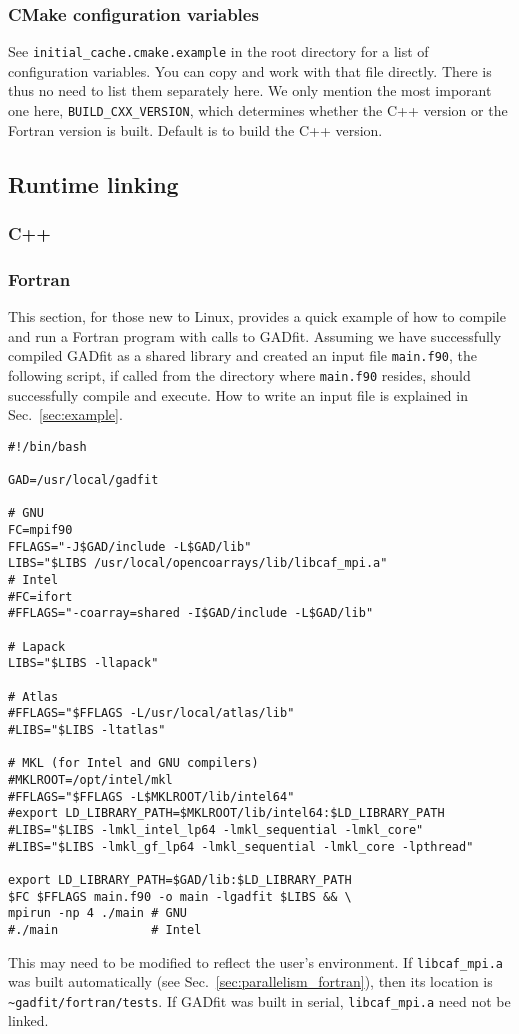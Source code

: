 \documentclass{article}
\begin{document}
\subsubsection{\label{sec:cmake_configuration}CMake configuration variables}

See \verb+initial_cache.cmake.example+ in the root directory for a list of configuration variables. You can copy and work with that file directly. There is thus no need to list them separately here. We only mention the most imporant one here, \verb+BUILD_CXX_VERSION+, which determines whether the C++ version or the Fortran version is built. Default is to build the C++ version.

\subsection{\label{sec:runtime}Runtime linking}

\subsubsection{C++}

\subsubsection{Fortran}

This section, for those new to Linux, provides a quick example of how to compile and run a Fortran program with calls to GADfit. Assuming we have successfully compiled GADfit as a shared library and created an input file \verb+main.f90+, the following script, if called from the directory where \verb+main.f90+ resides, should successfully compile and execute. How to write an input file is explained in Sec.~\ref{sec:example}.
\begin{verbatim}
#!/bin/bash

GAD=/usr/local/gadfit

# GNU
FC=mpif90
FFLAGS="-J$GAD/include -L$GAD/lib"
LIBS="$LIBS /usr/local/opencoarrays/lib/libcaf_mpi.a"
# Intel
#FC=ifort
#FFLAGS="-coarray=shared -I$GAD/include -L$GAD/lib"

# Lapack
LIBS="$LIBS -llapack"

# Atlas
#FFLAGS="$FFLAGS -L/usr/local/atlas/lib"
#LIBS="$LIBS -ltatlas"

# MKL (for Intel and GNU compilers)
#MKLROOT=/opt/intel/mkl
#FFLAGS="$FFLAGS -L$MKLROOT/lib/intel64"
#export LD_LIBRARY_PATH=$MKLROOT/lib/intel64:$LD_LIBRARY_PATH
#LIBS="$LIBS -lmkl_intel_lp64 -lmkl_sequential -lmkl_core"
#LIBS="$LIBS -lmkl_gf_lp64 -lmkl_sequential -lmkl_core -lpthread"

export LD_LIBRARY_PATH=$GAD/lib:$LD_LIBRARY_PATH
$FC $FFLAGS main.f90 -o main -lgadfit $LIBS && \
mpirun -np 4 ./main # GNU
#./main             # Intel
\end{verbatim}
This may need to be modified to reflect the user's environment. If \verb+libcaf_mpi.a+ was built automatically (see Sec.~\ref{sec:parallelism_fortran}), then its location is \verb+~gadfit/fortran/tests+. If GADfit was built in serial, \verb+libcaf_mpi.a+ need not be linked.
\end{document}
